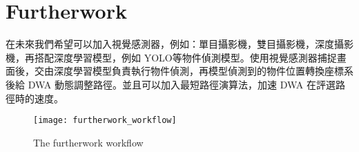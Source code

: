 \documentclass[crop=false]{standalone}
\begin{document}
	\section{Furtherwork}
	
	在未來我們希望可以加入視覺感測器，例如：單目攝影機，雙目攝影機，深度攝影機，再搭配深度學習模型，例如 YOLO等物件偵測模型。使用視覺感測器捕捉畫面後，交由深度學習模型負責執行物件偵測，再模型偵測到的物件位置轉換座標系後給 DWA 動態調整路徑。並且可以加入最短路徑演算法，加速 DWA 在評選路徑時的速度。
	
	\begin{figure*}[thbp!]
		\centering
		\texttt{[image: furtherwork\_workflow]}
		\caption{The furtherwork workflow}
		\label{fig:furtherwork}
	\end{figure*}
\end{document}
